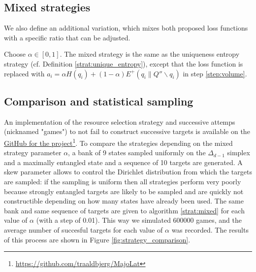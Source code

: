 


\subsection{Mixed strategies}

We also define an additional variation, which mixes both proposed loss functions with a specific ratio that can be adjusted.

\begin{definition} \label{strat:mixed}
    Choose $\alpha \in [0, 1]$. The mixed strategy is the same as the uniqueness entropy strategy (cf. Definition \ref{strat:unique_entropy}), except that the loss function is replaced with $a_i = \alpha H(q_i) + (1 - \alpha) E^+(q_i \parallel Q'' \backslash q_i)$ in step \ref{step:volume}.
\end{definition}



\subsection{Comparison and statistical sampling}

An implementation of the resource selection strategy and successive attemps (nicknamed "games") to not fail to construct successive targets is available on the \href{https://github.com/traaldbjerg/MajoLat}{GitHub for the project}\footnote{\url{https://github.com/traaldbjerg/MajoLat}}. To compare the strategies depending on the mixed strategy parameter $\alpha$, a bank of 9 states sampled uniformly on the $\Delta_{d-1}$ simplex and a maximally entangled state and a sequence of 10 targets are generated. A skew parameter allows to control the Dirichlet distribution from which the targets are sampled: if the sampling is uniform then all strategies perform very poorly because strongly entangled targets are likely to be sampled and are quickly not constructible depending on how many states have already been used. The same bank and same sequence of targets are given to algorithm \ref{strat:mixed} for each value of $\alpha$ (with a step of 0.01). This way we simulated 600000 games, and the average number of succesful targets for each value of $\alpha$ was recorded. The results of this process are shown in Figure \ref{fig:strategy_comparison}.

